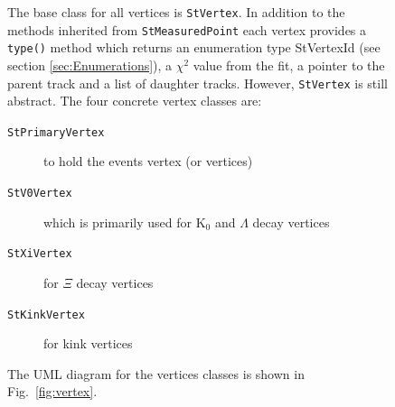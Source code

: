\documentclass[twoside]{article}
\begin{document}
\begin{figure}[htb]
\begin{center}
The base class for all vertices is \texttt{StVertex}. In addition to
the methods inherited from \texttt{StMeasuredPoint} each vertex
provides a \texttt{type()} method which returns an enumeration type
StVertexId (see section \ref{sec:Enumerations}), a $\chi^2$ value from
the fit, a pointer to the parent track and a list of daughter tracks.
However, \texttt{StVertex} is still abstract. The four concrete vertex
classes are:
\begin{description}
\item[\texttt{StPrimaryVertex}] to hold the events vertex (or
    vertices)
\item[\texttt{StV0Vertex}] which is primarily used for K$_0$ and
    $\Lambda$ decay vertices
\item[\texttt{StXiVertex}] for $\Xi$ decay vertices
\item[\texttt{StKinkVertex}] for kink vertices
\end{description}
The UML diagram for the vertices classes is shown in
Fig.~\ref{fig:vertex}.


\end{center}
\end{figure}
\end{document}
